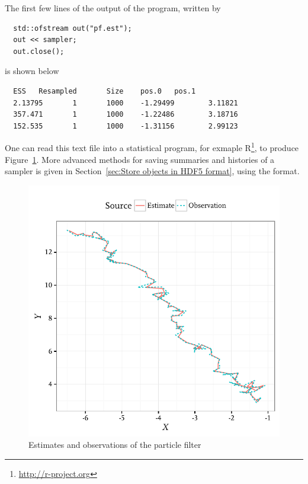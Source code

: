 The first few lines of the output of the program, written by
\begin{Verbatim}
  std::ofstream out("pf.est");
  out << sampler;
  out.close();
\end{Verbatim}
is shown below
\begin{Verbatim}
  ESS   Resampled       Size    pos.0   pos.1
  2.13795       1       1000    -1.29499        3.11821
  357.471       1       1000    -1.22486        3.18716
  152.535       1       1000    -1.31156        2.99123
\end{Verbatim}
One can read this text file into a statistical program, for exmaple
R\footnote{\url{http://r-project.org}}, to produce Figure~\ref{fig:pf}. More
advanced methods for saving summaries and histories of a sampler is given in
Section~\ref{sec:Store objects in HDF5 format}, using the \hdf format.

\begin{figure}
  \includegraphics{fig/pf}
  \caption{Estimates and observations of the particle filter}
  \label{fig:pf}
\end{figure}

